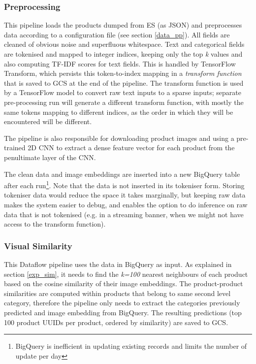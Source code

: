 \subsubsection{Preprocessing}

This pipeline loads the products dumped from ES (as JSON) and preprocesses data according to a configuration file (see section \ref{data_pp}).
All fields are cleaned of obvious noise and superfluous whitespace.
Text and categorical fields are tokenised and mapped to integer indices, keeping only the top \textit{k} values and also computing TF-IDF scores for text fields.
This is handled by TensorFlow Transform, which persists this token-to-index mapping in a \textit{transform function} that is saved to GCS at the end of the pipeline.
The transform function is used by a TensorFlow model to convert raw text inputs to a  sparse inputs;
separate pre-processing run will generate a different transform function, with mostly the same tokens mapping to different indices, as the order in which they will be encountered will be different.

The pipeline is also responsible for downloading product images and using a pre-trained 2D CNN to extract a dense feature vector for each product from the penultimate layer of the CNN.

The clean data and image embeddings  are inserted into a new BigQuery table after each run\footnote{BigQuery is inefficient in updating existing records and limits the number of update per day}.
Note that the data is not inserted in its tokeniser form.
Storing tokeniser data would reduce the space it takes marginally, but keeping raw data makes the system easier to debug, and enables the option to do inference on raw data that is not tokenised (e.g. in a streaming banner, when we might not have access to the transform function).

\subsubsection{Visual Similarity}


This Dataflow pipeline uses the data in BigQuery as input.
As explained in section \ref{exp_sim}, it needs to find the \textit{k=100} nearest neighbours of each product based on the cosine similarity of their image embeddings.
The product-product  similarities are computed within products that belong to same second level category,  therefore the pipeline only needs to extract  the categories previously predicted and image embedding from BigQuery.
The resulting predictions (top 100 product UUIDs per product, ordered by  similarity)  are saved to GCS.

